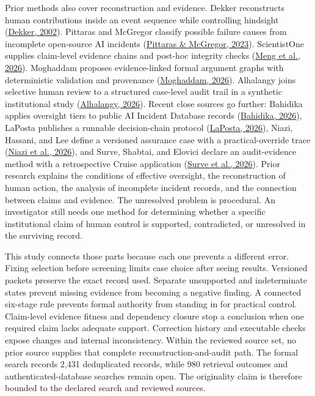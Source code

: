 \documentclass[11pt]{article}
\begin{document}
Prior methods also cover reconstruction and evidence. Dekker reconstructs human contributions inside an event sequence while controlling hindsight (\href{https://doi.org/10.1016/S0022-4375(02)00032-4}{Dekker, 2002}). Pittaras and McGregor classify possible failure causes from incomplete open-source AI incidents (\href{https://ceur-ws.org/Vol-3381/17.pdf}{Pittaras \& McGregor, 2023}). ScientistOne supplies claim-level evidence chains and post-hoc integrity checks (\href{https://doi.org/10.48550/arXiv.2605.26340}{Meng et al., 2026}). Moghaddam proposes evidence-linked formal argument graphs with deterministic validation and provenance (\href{https://doi.org/10.48550/arXiv.2604.04103}{Moghaddam, 2026}). Alhalangy joins selective human review to a structured case-level audit trail in a synthetic institutional study (\href{https://doi.org/10.3390/info17070694}{Alhalangy, 2026}). Recent close sources go further: Bahidika applies oversight tiers to public AI Incident Database records (\href{https://doi.org/10.14569/IJACSA.2026.0170502}{Bahidika, 2026}), LaPosta publishes a runnable decision-chain protocol (\href{https://doi.org/10.1609/aaaiss.v8i1.42543}{LaPosta, 2026}), Niazi, Hassani, and Lee define a versioned assurance case with a practical-override trace (\href{https://doi.org/10.3390/automation7030096}{Niazi et al., 2026}), and Surve, Shabtai, and Elovici declare an audit-evidence method with a retrospective Cruise application (\href{https://doi.org/10.48550/arXiv.2606.21276}{Surve et al., 2026}).
Prior research explains the conditions of effective oversight, the reconstruction of human action, the analysis of incomplete incident records, and the connection between claims and evidence. The unresolved problem is procedural. An investigator still needs one method for determining whether a specific institutional claim of human control is supported, contradicted, or unresolved in the surviving record.

This study connects those parts because each one prevents a different error. Fixing selection before screening limits case choice after seeing results. Versioned packets preserve the exact record used. Separate unsupported and indeterminate states prevent missing evidence from becoming a negative finding. A connected six-stage rule prevents formal authority from standing in for practical control. Claim-level evidence fitness and dependency closure stop a conclusion when one required claim lacks adequate support. Correction history and executable checks expose changes and internal inconsistency. Within the reviewed source set, no prior source supplies that complete reconstruction-and-audit path. The formal search records 2,431 deduplicated records, while 980 retrieval outcomes and authenticated-database searches remain open. The originality claim is therefore bounded to the declared search and reviewed sources.
\end{document}

